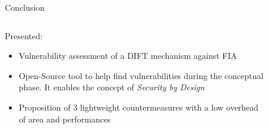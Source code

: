 \begin{frame}{Conclusion}
    \begin{columns}
        \begin{column}{.7\linewidth}
            \begin{block}{Presented:}
                \begin{itemize}
                    [triangle]
                    \item<1> Vulnerability assessment of a DIFT mechanism against FIA
                    \item<2> Open-Source tool to help find vulnerabilities during the conceptual phase. It enables the concept of \textit{Security by Design}
                    \item<3> Proposition of 3 lightweight countermeasures with a low overhead of area and performances
                \end{itemize}
            \end{block}
        \end{column}
        \begin{column}{.3\linewidth}
            \begin{figure}
                \centering

\end{figure}
\end{column}
\end{columns}
\end{frame}

